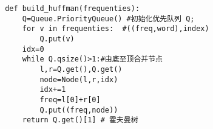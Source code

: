 \documentclass[master,openright,oneside,color]{../buaathesis}
\begin{document}
\begin{verbatim}
 def build_huffman(frequenties):
     Q=Queue.PriorityQueue() #初始化优先队列 Q;
     for v in frequenties:  #((freq,word),index)
         Q.put(v)
     idx=0
     while Q.qsize()>1:#由底至顶合并节点
         l,r=Q.get(),Q.get()
         node=Node(l,r,idx)
         idx+=1
         freq=l[0]+r[0]
         Q.put((freq,node))
     return Q.get()[1] # 霍夫曼树
\end{verbatim}
\end{document}
